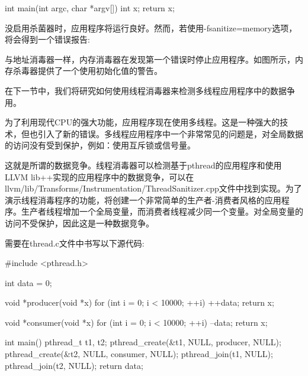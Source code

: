 \begin{cpp}
int main(int argc, char *argv[]) {
    int x;
    return x;
}
\end{cpp}

没启用杀菌器时，应用程序将运行良好。然而，若使用-fsanitize=memory选项，将会得到一个错误报告:


与地址消毒器一样，内存消毒器在发现第一个错误时停止应用程序。如图所示，内存杀毒器提供了一个使用初始化值的警告。

在下一节中，我们将研究如何使用线程消毒器来检测多线程应用程序中的数据争用。


为了利用现代CPU的强大功能，应用程序现在使用多线程。这是一种强大的技术，但也引入了新的错误。多线程应用程序中一个非常常见的问题是，对全局数据的访问没有受到保护，例如：使用互斥锁或信号量。

这就是所谓的数据竞争。线程消毒器可以检测基于pthread的应用程序和使用LLVM lib++实现的应用程序中的数据竞争，可以在llvm/lib/Transforms/Instrumentation/ThreadSanitizer.cpp文件中找到实现。为了演示线程消毒程序的功能，将创建一个非常简单的生产者-消费者风格的应用程序。生产者线程增加一个全局变量，而消费者线程减少同一个变量。对全局变量的访问不受保护，因此这是一种数据竞争。

需要在thread.c文件中书写以下源代码:

\begin{cpp}
#include <pthread.h>

int data = 0;

void *producer(void *x) {
    for (int i = 0; i < 10000; ++i) ++data;
    return x;
}

void *consumer(void *x) {
    for (int i = 0; i < 10000; ++i) --data;
    return x;
}

int main() {
    pthread_t t1, t2;
    pthread_create(&t1, NULL, producer, NULL);
    pthread_create(&t2, NULL, consumer, NULL);
    pthread_join(t1, NULL);
    pthread_join(t2, NULL);
    return data;
}
\end{cpp}

